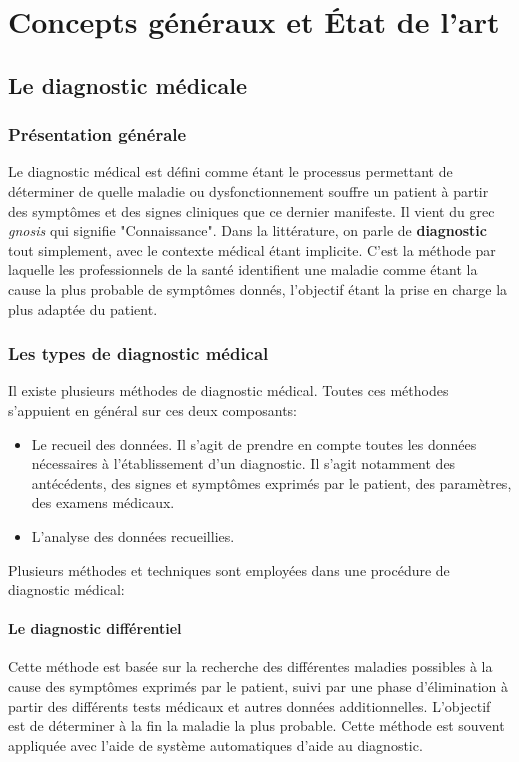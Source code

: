 
\chapter{Concepts généraux et État de l'art}
\label{chp:etat_art}


\section{Le diagnostic médicale}

\subsection{Présentation générale}
Le diagnostic médical est défini comme étant le processus permettant de déterminer de quelle maladie ou dysfonctionnement souffre un patient à partir des symptômes et des signes cliniques que ce dernier manifeste. Il vient du grec \textit{gnosis} qui signifie "Connaissance".
Dans la littérature, on parle de \textbf{diagnostic} tout simplement, avec le contexte médical étant implicite.
C'est la méthode par laquelle les professionnels de la santé identifient une maladie comme étant la cause la plus probable de symptômes donnés, l'objectif étant la prise en charge la plus adaptée du patient.


\subsection{Les types de diagnostic médical}
Il existe plusieurs méthodes de diagnostic médical. Toutes ces méthodes s'appuient en général sur ces deux composants:
\begin{itemize}
    \item Le recueil des données. Il s'agit de prendre en compte toutes les données nécessaires à l'établissement d'un diagnostic. Il s'agit notamment des antécédents, des signes et symptômes exprimés par le patient, des paramètres, des examens médicaux.
    \item L'analyse des données recueillies.
\end{itemize}

Plusieurs méthodes et techniques sont employées dans une procédure de diagnostic médical:

\subsubsection{Le diagnostic différentiel} 
Cette méthode est basée sur la recherche des différentes maladies possibles à la cause des symptômes exprimés par le patient, suivi par une phase d'élimination à partir des différents tests médicaux et autres données additionnelles. L'objectif est de déterminer à la fin la maladie la plus probable. Cette méthode est souvent appliquée avec l'aide de système automatiques d'aide au diagnostic.

